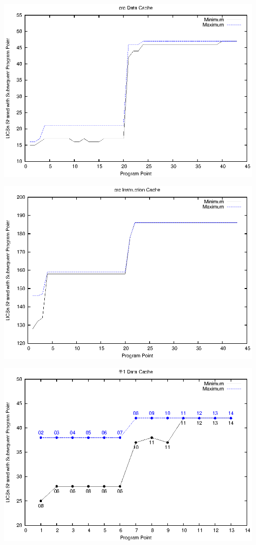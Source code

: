 \begin{center}
  \includegraphics[width=\linewidth]{eps/crc-dcache.eps}
\end{center}
\begin{center}
  \includegraphics[width=\linewidth]{eps/crc-icache.eps}
\end{center}
\begin{center}
  \includegraphics[width=\linewidth]{eps/fft1-dcache.eps}
\end{center}
